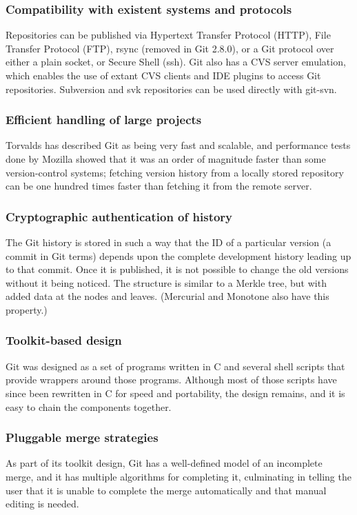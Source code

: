 \documentclass[a4paper]{report}
\begin{document}
\subsubsection{Compatibility with existent systems and protocols}
Repositories can be published via Hypertext Transfer Protocol (HTTP), File Transfer Protocol (FTP), rsync (removed in Git 2.8.0), or a Git protocol over either a plain socket, or Secure Shell (ssh). Git also has a CVS server emulation, which enables the use of extant CVS clients and IDE plugins to access Git repositories. Subversion and svk repositories can be used directly with git-svn.
\subsubsection{Efficient handling of large projects}
Torvalds has described Git as being very fast and scalable, and performance tests done by Mozilla showed that it was an order of magnitude faster than some version-control systems; fetching version history from a locally stored repository can be one hundred times faster than fetching it from the remote server.
\subsubsection{Cryptographic authentication of history}
The Git history is stored in such a way that the ID of a particular version (a commit in Git terms) depends upon the complete development history leading up to that commit. Once it is published, it is not possible to change the old versions without it being noticed. The structure is similar to a Merkle tree, but with added data at the nodes and leaves. (Mercurial and Monotone also have this property.)
\subsubsection{Toolkit-based design}
Git was designed as a set of programs written in C and several shell scripts that provide wrappers around those programs. Although most of those scripts have since been rewritten in C for speed and portability, the design remains, and it is easy to chain the components together.
\subsubsection{Pluggable merge strategies}
As part of its toolkit design, Git has a well-defined model of an incomplete merge, and it has multiple algorithms for completing it, culminating in telling the user that it is unable to complete the merge automatically and that manual editing is needed.
\end{document}
